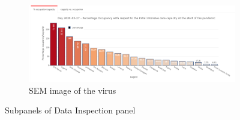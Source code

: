 \documentclass[
12pt, %
a4paper, %
oneside, %
headinclude,footinclude, %
BCOR5mm, %
]{scrartcl}
\begin{document}
\begin{figure}[H]
\begin{subfigure}{.8\textwidth}
  \caption{}
  \label{fig:Inspection_test_tracking}
\end{subfigure} 
\begin{subfigure}{.8\textwidth}
  \centering
  \includegraphics[width=1\linewidth]{Figures/Inspection_Cattura.png} 
  \caption{SEM image of the virus}
  \label{fig:Inspection_Cattura}
\end{subfigure} 
\caption{Subpanels of Data Inspection panel }
\end{figure}
\end{document}
